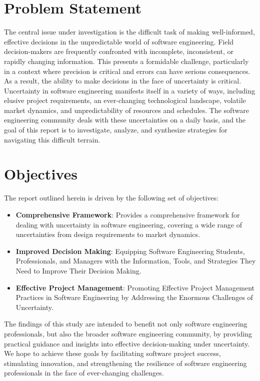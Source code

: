 \documentclass[a4paper,12pt]{report}
\begin{document}
\section{Problem Statement}
The central issue under investigation is the difficult task of making well-informed, effective decisions in the unpredictable world of software engineering. Field decision-makers are frequently confronted with incomplete, inconsistent, or rapidly changing information. This presents a formidable challenge, particularly in a context where precision is critical and errors can have serious consequences. As a result, the ability to make decisions in the face of uncertainty is critical.
\\ Uncertainty in software engineering manifests itself in a variety of ways, including elusive project requirements, an ever-changing technological landscape, volatile market dynamics, and unpredictability of resources and schedules. The software engineering community deals with these uncertainties on a daily basis, and the goal of this report is to investigate, analyze, and synthesize strategies for navigating this difficult terrain.
\newpage


\section{Objectives}
The report outlined herein is driven by the following set of objectives:
\begin{itemize}
    \item \textbf{Comprehensive Framework}: Provides a comprehensive framework for dealing with uncertainty in software engineering, covering a wide range of uncertainties from design requirements to market dynamics.
    \item \textbf{Improved Decision Making}: Equipping Software Engineering Students, Professionals, and Managers with the Information, Tools, and Strategies They Need to Improve Their Decision Making.
    \item \textbf{Effective Project Management}: Promoting Effective Project Management Practices in Software Engineering by Addressing the Enormous Challenges of Uncertainty.
\end{itemize}
The findings of this study are intended to benefit not only software engineering professionals, but also the broader software engineering community, by providing practical guidance and insights into effective decision-making under uncertainty. We hope to achieve these goals by facilitating software project success, stimulating innovation, and strengthening the resilience of software engineering professionals in the face of ever-changing challenges.
\end{document}
